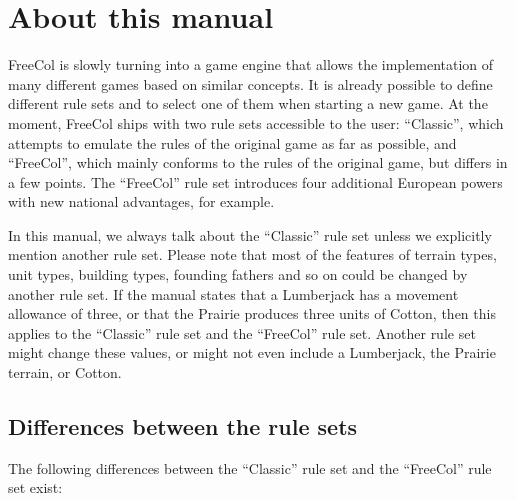 \documentclass[12pt]{book}
\begin{document}
\hypertarget{About this manual}{\section{About this manual}}

FreeCol is slowly turning into a game engine that allows the
implementation of many different games based on similar concepts. It
is already possible to define different rule sets and to select one of
them when starting a new game. At the moment, FreeCol ships with two
rule sets accessible to the user: ``Classic'', which attempts to
emulate the rules of the original game as far as possible, and
``FreeCol'', which mainly conforms to the rules of the original game,
but differs in a few points. The ``FreeCol'' rule set introduces four
additional European powers with new national advantages, for example.

In this manual, we always talk about the ``Classic'' rule set unless
we explicitly mention another rule set. Please note that most of the
features of terrain types, unit types, building types, founding
fathers and so on could be changed by another rule set. If the manual
states that a Lumberjack has a movement allowance of three, or that
the Prairie produces three units of Cotton, then this applies to the
``Classic'' rule set and the ``FreeCol'' rule set. Another rule set
might change these values, or might not even include a Lumberjack, the
Prairie terrain, or Cotton.

\hypertarget{Differences between the rule
  sets}{\subsection{Differences between the rule sets}}

The following differences between the ``Classic'' rule set and the
``FreeCol'' rule set exist:
\end{document}
